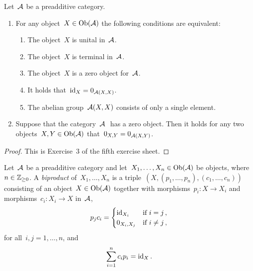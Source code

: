 \begin{lemma}
  \label{inital terminal zero}
  Let~$\mathcal{A}$ be a preadditive category.
  \begin{enumerate}
    \item
      For any object~$X \in \operatorname{Ob}(\mathcal{A})$ the following conditions are equivalent:
      \begin{enumerate}
        \item
          The object~$X$ is unital in~$\mathcal{A}$.
        \item
          The object~$X$ is terminal in~$\mathcal{A}$.
        \item
          The object~$X$ is a zero object for~$\mathcal{A}$.
        \item
          It holds that~$\operatorname{id}_X = 0_{\mathcal{A}(X,X)}$.
        \item
          The abelian group~$\mathcal{A}(X,X)$ consists of only a single element.
      \end{enumerate}
    \item
      Suppose that the category~$\mathcal{A}~$ has a zero object.
      Then it holds for any two objects~$X, Y \in \operatorname{Ob}(\mathcal{A})$ that~$0_{X,Y} = 0_{\mathcal{A}(X,Y)}$.
  \end{enumerate}
\end{lemma}


\begin{proof}
  This is Exercise~3 of the fifth exercise sheet.
\end{proof}







\begin{definition}
  Let~$\mathcal{A}$ be a preadditive category and let~$X_1, \dotsc, X_n \in \operatorname{Ob}(\mathcal{A})$ be objects, where~$n \in \mathbb{Z}_{\geq 0}$.
  A \emph{biproduct} of~$X_1, \dotsc, X_n$ is a triple~$(X, (p_1, \dotsc, p_n), (c_1, \dotsc, c_n))$ consisting of an object~$X \in \operatorname{Ob}(\mathcal{A})$ together with morphisms~$p_i \colon X \to X_i$ and morphisms~$c_i \colon X_i \to X$ in~$\mathcal{A}$,
  \begin{equation}
    \label{no abuse of notation}
      p_j c_i
    = \begin{cases}
        \operatorname{id}_{X_i}     & \text{if~$i = j$}     \,, \\
        0_{X_i, X_j}  & \text{if~$i \neq j$}  \,,
      \end{cases}
  \end{equation}
  for all~$i,j = 1, \dots, n$, and
  \[
      \sum_{i=1}^n c_i p_i
    = {\operatorname{id}_X} \,.
  \]
\end{definition}


